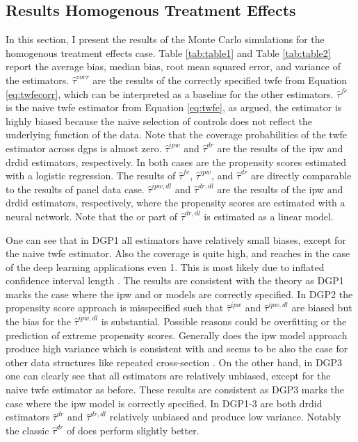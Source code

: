 \subsection{Results Homogenous Treatment Effects}



In this section, I present the results of the Monte Carlo simulations for the homogenous treatment effects case.
Table \ref{tab:table1} and Table \ref{tab:table2} report the average bias, median bias, root mean squared error, and variance of the estimators.
$\hat{\tau}^{corr}$ are the results of the correctly specified \ac{twfe} from Equation \ref{eq:twfecorr}, which can be interpreted as a baseline for the other estimators.
$\hat{\tau}^{fe}$ is the naive \ac{twfe} estimator from Equation \ref{eq:twfe}, as argued, the estimator is highly biased because the naive selection of controls does not reflect the underlying function of the data.
Note that the coverage probabilities of the \ac{twfe} estimator across \ac{dgp}s is almost zero.
$\hat{\tau}^{ipw}$ and $\hat{\tau}^{dr}$ are the results of the \ac{ipw} and \ac{drdid} estimators, respectively.
In both cases are the propensity scores estimated with a logistic regression.
The results of $\hat{\tau}^{fe}$, $\hat{\tau}^{ipw}$, and $\hat{\tau}^{dr}$ are directly comparable to the results of \citet{santannaDoublyRobustDifferenceindifferences2020} panel data case.
$\hat{\tau}^{ipw,dl}$ and $\hat{\tau}^{dr,dl}$ are the results of the \ac{ipw} and \ac{drdid} estimators, respectively, where the propensity scores are estimated with a neural network.
Note that the \ac{or} part of $\hat{\tau}^{dr,dl}$ is estimated as a linear model.

One can see that in DGP1 all estimators have relatively small biases, except for the naive \ac{twfe} estimator.
Also the coverage is quite high, and reaches in the case of the deep learning applications even 1.
This is most likely due to inflated confidence interval length \citep{farrellDeepNeuralNetworks2021}.
The results are consistent with the theory as DGP1 marks the case where the \ac{ipw} and \ac{or} models are correctly specified.
In DGP2 the propensity score approach is misspecified such that $\hat{\tau}^{ipw}$ and $\hat{\tau}^{ipw,dl}$ are biased but the bias for the  $\hat{\tau}^{ipw,dl}$ is substantial.
Possible reasons could be overfitting or the prediction of extreme propensity scores.
Generally does the \ac{ipw} model approach produce high variance which is consistent with \citet{santannaDoublyRobustDifferenceindifferences2020} and seems to be also the case for other data structures like repeated cross-section \citep{santannaDoublyRobustDifferenceindifferences2020,manfeDifferenceInDifferenceDesignRepeated}.
On the other hand, in DGP3 one can clearly see that all estimators are relatively unbiased, except for the naive \ac{twfe} estimator as before.
These results are consistent as DGP3 marks the case where the \ac{ipw} model is correctly specified.
In DGP1-3 are both \ac{drdid} estimators $\hat{\tau}^{dr}$ and $\hat{\tau}^{dr,dl}$ relatively unbiased and produce low variance.
Notably the classic $\hat{\tau}^{dr}$ of \citet{santannaDoublyRobustDifferenceindifferences2020} does perform slightly better.

